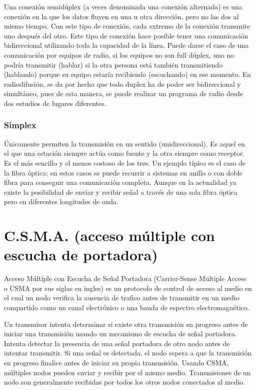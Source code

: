 \documentclass[a4paper]{article}
\begin{document}
	Una conexión semidúplex (a veces denominada una conexión alternada) es una conexión en la que los datos fluyen en una u otra dirección, pero no las dos al mismo tiempo. Con este tipo de conexión, cada extremo de la conexión transmite uno después del otro. Este tipo de conexión hace posible tener una comunicación bidireccional utilizando toda la capacidad de la línea. Puede darse el caso de una comunicación por equipos de radio, si los equipos no son full dúplex, uno no podría transmitir (hablar) si la otra persona está también transmitiendo (hablando) porque su equipo estaría recibiendo (escuchando) en ese momento. En radiodifusión, se da por hecho que todo duplex ha de poder ser bidireccional y simultáneo, pues de esta manera, se puede realizar un programa de radio desde dos estudios de lugares diferentes.
	\subsubsection{Simplex}
	Únicamente permiten la transmisión en un sentido (unidireccional). Es aquel en el que una estación siempre actúa como fuente y la otra siempre como receptor. Es el más sencillo y el menos costoso de los tres. Un ejemplo típico es el caso de la fibra óptica; en estos casos se puede recurrir a sistemas en anillo o con doble fibra para conseguir una comunicación completa. Aunque en la actualidad ya existe la posibilidad de enviar y recibir señal a través de una sola fibra óptica pero en diferentes longitudes de onda.
	
	\section{C.S.M.A. (acceso múltiple con escucha de portadora)}
	Acceso Múltiple con Escucha de Señal Portadora (Carrier-Sense Multiple Access o CSMA por sus siglas en ingles) es un protocolo de control de acceso al medio en el cual un nodo verifica la ausencia de trafico antes de transmitir en un medio compartido como un canal electrónico o una banda de espectro electromagnético.
	
	Un transmisor intenta determinar si existe otra transmisión en progreso antes de iniciar una transmisión usando un mecanismo de escucha de señal portadora. Intenta detectar la presencia de una señal portadora de otro nodo antes de intentar transmitir. Si una señal es detectada, el nodo espera a que la transmisión en progreso finalice antes de iniciar su propia transmisión. Usando CSMA, múltiples nodos pueden enviar y recibir por el mismo medio. Transmisiones de un nodo son generalmente recibidas por todos los otros nodos conectados al medio.
	
\end{document}
